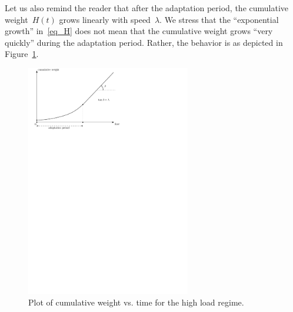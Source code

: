 \documentclass[12pt]{article}
\begin{document}
\begin{CJK}{UTF8}{bkai}
Let us also remind the reader that
 after the adaptation period,
the cumulative weight~$H(t)$ grows linearly
with speed~$\lambda $. We stress that the ``exponential
growth'' in~\eqref{eq_H} does not mean that 
the cumulative weight grows ``very quickly'' 
during the adaptation period. Rather, the behavior
is as depicted in Figure~\ref{f_adapt_period}.
\begin{figure}
 \centering \includegraphics[width=0.64\textwidth]{adapt_period_1} 
\caption{Plot of cumulative weight vs. time for the high load regime.
}
\label{f_adapt_period}
\end{figure}


\goodbreak


\end{CJK}
\end{document}
